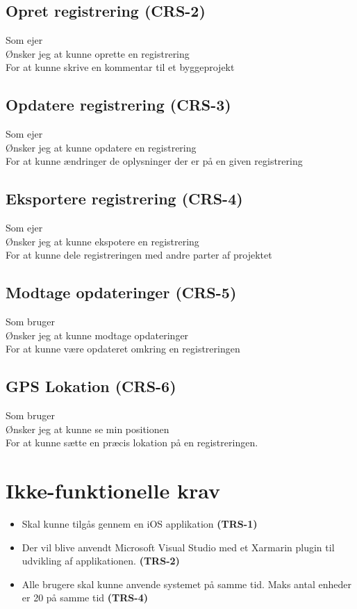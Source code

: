 	\subsection*{Opret registrering (CRS-2)}
	Som ejer\\
	Ønsker jeg at kunne oprette en registrering\\
	For at kunne skrive en kommentar til et byggeprojekt
	
	\subsection*{Opdatere registrering (CRS-3)}
	Som ejer\\
	Ønsker jeg at kunne opdatere en registrering\\
	For at kunne ændringer de oplysninger der er på en given registrering
	
	\subsection*{Eksportere registrering (CRS-4)}
	Som ejer\\
	Ønsker jeg at kunne ekspotere en registrering\\
	For at kunne dele registreringen med andre parter af projektet
	
	\subsection*{Modtage opdateringer (CRS-5)}
	Som bruger\\
	Ønsker jeg at kunne modtage opdateringer\\
	For at kunne være opdateret omkring en registreringen
	
	\subsection*{GPS Lokation (CRS-6)}
	Som bruger\\
	Ønsker jeg at kunne se min positionen \\
	For at kunne sætte en præcis lokation på en registreringen. \\
	
	\section{Ikke-funktionelle krav}
	\begin{itemize}[-]
		\itemsep 0.3em 
		\item Skal kunne tilgås gennem en iOS applikation \textbf{(TRS-1)}
		\item Der vil blive anvendt Microsoft Visual Studio med et Xarmarin plugin til udvikling af applikationen. \textbf{(TRS-2)}
		\item Alle brugere skal kunne anvende systemet på samme tid. Maks antal enheder er 20 på samme tid \textbf{(TRS-4)}
	\end{itemize}
	